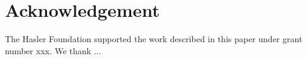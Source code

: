 \documentclass[10pt,conference,a4paper]{IEEEtran}
\begin{document}
\section{Acknowledgement}
The Hasler Foundation supported the work described in this paper under grant number xxx. We thank ...





\end{document}
